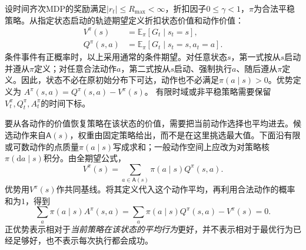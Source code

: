 \begin{definition}
  \label{def:rl-overview-values}
  设时间齐次MDP的奖励满足$|r_t|\leq R_{\max}<\infty$，折扣因子$0\leq\gamma<1$，$\pi$为合法平稳策略。从指定状态启动的轨迹期望定义折扣状态价值和动作价值：
  \begin{equation}
  \begin{aligned}
    V^\pi(s)&=\mathbb E_\pi[G_t\mid s_t=s],\\
    Q^\pi(s,a)&=\mathbb E_\pi[G_t\mid s_t=s,a_t=a].
  \end{aligned}
  \label{eq:rl-overview-values}
  \end{equation}
  条件事件有正概率时，以上采用通常的条件期望。对任意状态$s$，第一式按从$s$启动并遵从$\pi$定义；对任意合法动作$a$，第二式按从$s$启动、强制执行$a$、随后遵从$\pi$定义。因此，状态不必在原初始分布下可达，动作也不必满足$\pi(a\mid s)>0$。优势定义为
  $A^\pi(s,a)=Q^\pi(s,a)-V^\pi(s)$。
  有限时域或非平稳策略需要保留$V_t^\pi,Q_t^\pi,A_t^\pi$的时间下标。
\end{definition}

要从各动作的价值恢复策略在该状态的价值，需要把当前动作选择也平均进去。候选动作来自$\mathsf A(s)$，权重由固定策略给出，而不是在这里挑选最大值。下面沿有限或可数动作的点质量$\pi(a\mid s)$写成求和；一般动作空间上应改为对策略核$\pi(\mathrm da\mid s)$积分。由全期望公式，
\begin{equation}
  V^\pi(s)=\sum_{a\in\mathsf A(s)}\pi(a\mid s)Q^\pi(s,a).
  \label{eq:rl-overview-vq}
\end{equation}
优势用$V^\pi(s)$作共同基线。将其定义代入这个动作平均，再利用合法动作的概率和为$1$，得到
\[
  \sum_a\pi(a\mid s)A^\pi(s,a)
  =\sum_a\pi(a\mid s)Q^\pi(s,a)-V^\pi(s)=0.
\]
正优势表示相对于\emph{当前策略在该状态的平均行为}更好，并不表示相对于最优行为已经足够好，也不表示每次执行都会成功。

